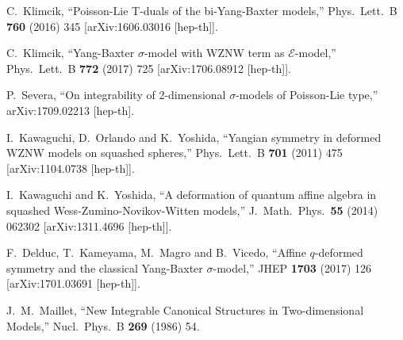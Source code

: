 \documentclass[12pt]{article}
\begin{document}
\begin{thebibliography}{99}
{  
  C.~Klimcik,
  ``Poisson-Lie T-duals of the bi-Yang-Baxter models,''
  Phys.\ Lett.\ B {\bf 760} (2016) 345
  [arXiv:1606.03016 [hep-th]].
  
  
  C.~Klimcik,
   ``Yang-Baxter $\sigma$-model with WZNW term as ${ \mathcal E}$-model,''
  Phys.\ Lett.\ B {\bf 772} (2017) 725
  [arXiv:1706.08912 [hep-th]].
  
  
  P.~Severa,
  ``On integrability of 2-dimensional $\sigma$-models of Poisson-Lie type,''
  arXiv:1709.02213 [hep-th].

  I.~Kawaguchi, D.~Orlando and K.~Yoshida,
  ``Yangian symmetry in deformed WZNW models on squashed spheres,''
  Phys.\ Lett.\ B {\bf 701} (2011) 475
  [arXiv:1104.0738 [hep-th]].
  
  I.~Kawaguchi and K.~Yoshida,
  ``A deformation of quantum affine algebra in squashed Wess-Zumino-Novikov-Witten models,''
  J.\ Math.\ Phys.\  {\bf 55} (2014) 062302
  [arXiv:1311.4696 [hep-th]].


  F.~Delduc, T.~Kameyama, M.~Magro and B.~Vicedo,
  ``Affine $q$-deformed symmetry and the classical Yang-Baxter  $\sigma$-model,''
  JHEP {\bf 1703} (2017) 126
  [arXiv:1701.03691 [hep-th]].
 
  J.~M.~Maillet,
  ``New Integrable Canonical Structures in Two-dimensional Models,''
  Nucl.\ Phys.\ B {\bf 269} (1986) 54.
  
}
\end{thebibliography}
\end{document}
